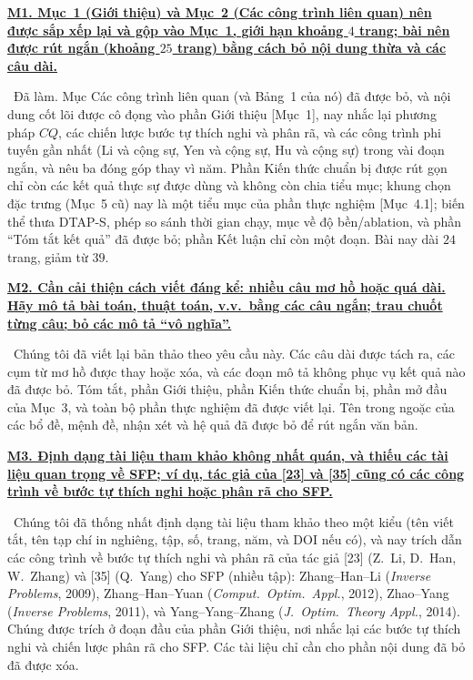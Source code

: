 \documentclass[11pt]{article}
\newcommand{\response}[1]{\smallskip\noindent{\color{blue!60!black}\textbf{Trả lời.}}\ #1\par\medskip}
\newcommand{\loc}[1]{\textcolor{blue!50!black}{[#1]}}
\newenvironment{point}[1]{\medskip\noindent\textbf{\uline{#1}}\par}{\par}
\begin{document}
\begin{point}{M1. Mục~1 (Giới thiệu) và Mục~2 (Các công trình liên quan) nên được sắp xếp lại và
gộp vào Mục~1, giới hạn khoảng $4$ trang; bài nên được rút ngắn (khoảng
$25$ trang) bằng cách bỏ nội dung thừa và các câu dài.}
\response{Đã làm. Mục Các công trình liên quan (và Bảng~1 của nó) đã được bỏ, và
nội dung cốt lõi được cô đọng vào phần Giới thiệu \loc{Mục~1}, nay nhắc lại
phương pháp $CQ$, các chiến lược bước tự thích nghi và phân rã, và các công trình phi tuyến
gần nhất (Li và cộng sự, Yen và cộng sự, Hu và cộng sự) trong vài đoạn ngắn, và nêu ba
đóng góp thay vì năm. Phần Kiến thức chuẩn bị được rút gọn chỉ còn các kết quả thực sự được dùng
và không còn chia tiểu mục; khung chọn đặc trưng (Mục~5 cũ) nay là
một tiểu mục của phần thực nghiệm \loc{Mục~4.1}; biến thể thưa DTAP-S, phép so sánh
thời gian chạy, mục về độ bền/ablation, và phần ``Tóm tắt kết quả'' đã được bỏ;
phần Kết luận chỉ còn một đoạn. Bài nay dài $24$ trang, giảm từ $39$.}
\end{point}

\begin{point}{M2. Cần cải thiện cách viết đáng kể: nhiều câu
mơ hồ hoặc quá dài. Hãy mô tả bài toán, thuật toán, v.v.\ bằng các câu ngắn; trau chuốt
từng câu; bỏ các mô tả ``vô nghĩa''.}
\response{Chúng tôi đã viết lại bản thảo theo yêu cầu này. Các câu dài được tách ra,
các cụm từ mơ hồ được thay hoặc xóa, và các đoạn mô tả không phục vụ
kết quả nào đã được bỏ. Tóm tắt, phần Giới thiệu, phần Kiến thức chuẩn bị, phần mở đầu của Mục~3,
và toàn bộ phần thực nghiệm đã được viết lại. Tên trong ngoặc của các bổ đề,
mệnh đề, nhận xét và hệ quả đã được bỏ để rút ngắn văn bản.}
\end{point}

\begin{point}{M3. Định dạng tài liệu tham khảo không nhất quán, và thiếu các tài liệu quan trọng về
SFP; ví dụ, tác giả của [23] và [35] cũng có các công trình về bước tự thích nghi hoặc phân rã
cho SFP.}
\response{Chúng tôi đã thống nhất định dạng tài liệu tham khảo theo một kiểu (tên viết tắt, tên tạp chí
in nghiêng, tập, số, trang, năm, và DOI nếu có), và nay trích dẫn các công trình
về bước tự thích nghi và phân rã của tác giả [23] (Z.~Li, D.~Han, W.~Zhang) và
[35] (Q.~Yang) cho SFP (nhiều tập): Zhang--Han--Li (\emph{Inverse Problems}, 2009),
Zhang--Han--Yuan (\emph{Comput.\ Optim.\ Appl.}, 2012), Zhao--Yang (\emph{Inverse
Problems}, 2011), và Yang--Yang--Zhang (\emph{J.\ Optim.\ Theory Appl.}, 2014). Chúng được
trích ở đoạn đầu của phần Giới thiệu, nơi nhắc lại các bước tự thích nghi và
chiến lược phân rã cho SFP. Các tài liệu chỉ cần cho phần nội dung đã bỏ
đã được xóa.}
\end{point}
\end{document}
